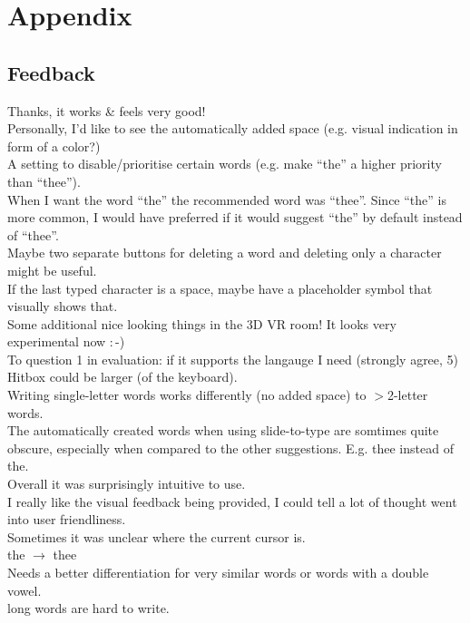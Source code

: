 \chapter{Appendix}
\section*{Feedback}
Thanks, it works \& feels very good!\\
Personally, I'd like to see the automatically added space (e.g. visual indication in form of a color?)\\
A setting to disable/prioritise certain words (e.g. make ``the'' a higher priority than ``thee'').\\
When I want the word ``the'' the recommended word was ``thee''. Since ``the'' is more common, I would have preferred if it would suggest ``the'' by default instead of ``thee''.\\
Maybe two separate buttons for deleting a word and deleting only a character might be useful.\\
If the last typed character is a space, maybe have a placeholder symbol that visually shows that.\\
Some additional nice looking things in the 3D VR room! It looks very experimental now $:$-)\\
To question 1 in evaluation: if it supports the langauge I need (strongly agree, 5)\\
Hitbox could be larger (of the keyboard).\\
Writing single-letter words works differently (no added space) to $>$2-letter words.\\
The automatically created words when using slide-to-type are somtimes quite obscure, especially when compared to the other suggestions. E.g. thee instead of the.\\
Overall it was surprisingly intuitive to use.\\
I really like the visual feedback being provided, I could tell a lot of thought went into user friendliness.\\
Sometimes it was unclear where the current cursor is.\\
the $\rightarrow$ thee\\
Needs a better differentiation for very similar words or words with a double vowel.\\
long words are hard to write.\\